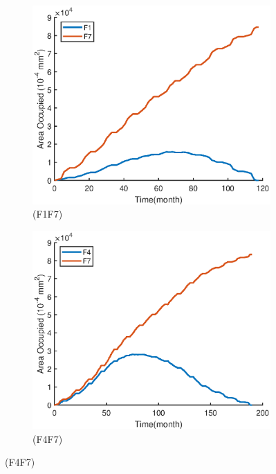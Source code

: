 \documentclass[a4paper,12pt]{article}
\begin{document}
\begin{figure}[H]
	\centering 
	\begin{subfigure}{0.4\textwidth}
		\includegraphics[width=\textwidth]{./4/E_F1F7_area.eps}
		\caption{(F1F7)}
		\label{E_F1F7_area}
	\end{subfigure}
	\begin{subfigure}{0.4\textwidth}
		\includegraphics[width=\textwidth]{./4/E_F4F7_area.eps}
		\caption{(F4F7)}
		\label{E_F4F7_area}
	\end{subfigure}

\end{figure}
\end{document}
